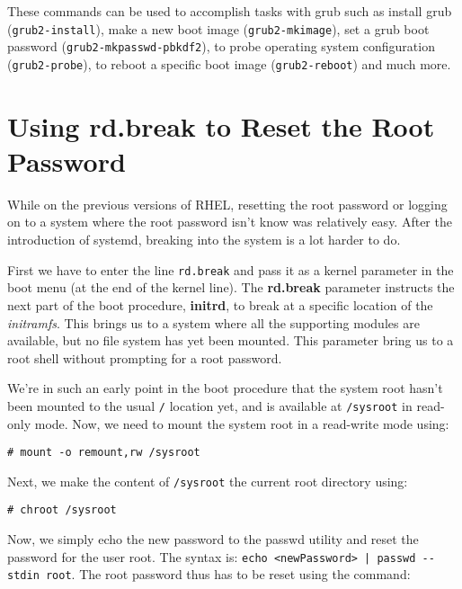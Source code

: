 \noindent
These commands can be used to accomplish tasks with grub such as install grub (\verb|grub2-install|), make a new boot image (\verb|grub2-mkimage|), set a grub boot password (\verb|grub2-mkpasswd-pbkdf2|), to probe operating system configuration (\verb|grub2-probe|), to reboot a specific boot image (\verb|grub2-reboot|) and much more. 

\section{Using rd.break to Reset the Root Password}
While on the previous versions of RHEL, resetting the root password or logging on to a system where the root password isn't know was relatively easy. After the introduction of systemd, breaking into the system is a lot harder to do. 

First we have to enter the line \verb|rd.break| and pass it as a kernel parameter in the boot menu (at the end of the kernel line). The \textbf{rd.break} parameter instructs the next part of the boot procedure, \textbf{initrd}, to break at a specific location of the \textit{initramfs}. This brings us to a system where all the supporting modules are available, but no file system has yet been mounted. This parameter bring us to a root shell without prompting for a root password. 

We're in such an early point in the boot procedure that the system root hasn't been mounted to the usual \verb|/| location yet, and is available at \verb|/sysroot| in read-only mode. Now, we need to mount the system root in a read-write mode using:

\vspace{-15pt}
\begin{verbatim}
# mount -o remount,rw /sysroot
\end{verbatim}
\vspace{-10pt}

\noindent
Next, we make the content of \verb|/sysroot| the current root directory using:

\vspace{-15pt}
\begin{verbatim}
# chroot /sysroot
\end{verbatim}
\vspace{-10pt}

\noindent
Now, we simply echo the new password to the passwd utility and reset the password for the user root. The syntax is: \verb:echo <newPassword> | passwd --stdin root:. The root password thus has to be reset using the command:

